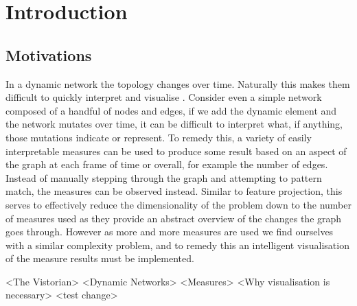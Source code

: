 
\chapter{Introduction}
\label{chap:introduction}
\ifpdf
    \graphicspath{{Introduction/Figures/PNG/}{Introduction/Figures/PDF/}{Introduction/Figures/}}
\else
    \graphicspath{{Introduction/Figures/EPS/}{Introduction/Figures/}}
\fi




\section{Motivations}
\label{motivations}
In a dynamic network the topology changes over time. Naturally this makes them difficult to quickly interpret and visualise \cite{iddps}. Consider even a simple network composed of a handful of nodes and edges, if we add the dynamic element and the network mutates over time,  it can be difficult to interpret what, if anything, those mutations indicate or represent. To remedy this, a variety of easily interpretable measures can be used to produce some result based on an aspect of the graph at each frame of time or overall, for example the number of edges. Instead of manually stepping through the graph and attempting to pattern match, the measures can be observed instead. Similar to feature projection, this serves to effectively reduce the dimensionality \cite{wikidimred} of the problem down to the number of measures used as they provide an abstract overview of the changes the graph goes through. However as more and more measures are used we find ourselves with a similar complexity problem, and to remedy this an intelligent visualisation of the measure results must be implemented.

<The Vistorian>
<Dynamic Networks>
<Measures>
<Why visualisation is necessary>
<test change>

